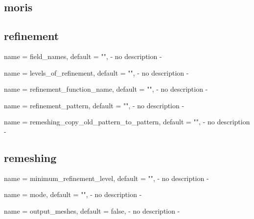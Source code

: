 \subsection{moris}

\subsection{refinement}

\begin{parameter}{
    name    = {field_names},
    default = {""},
}
- no description -
\end{parameter}

\begin{parameter}{
    name    = {levels_of_refinement},
    default = {""},
}
- no description -
\end{parameter}

\begin{parameter}{
    name    = {refinement_function_name},
    default = {""},
}
- no description -
\end{parameter}

\begin{parameter}{
    name    = {refinement_pattern},
    default = {""},
}
- no description -
\end{parameter}

\begin{parameter}{
    name    = {remeshing_copy_old_pattern_to_pattern},
    default = {""},
}
- no description -
\end{parameter}

\subsection{remeshing}

\begin{parameter}{
    name    = {minimum_refinement_level},
    default = {""},
}
- no description -
\end{parameter}

\begin{parameter}{
    name    = {mode},
    default = {""},
}
- no description -
\end{parameter}

\begin{parameter}{
    name    = {output_meshes},
    default = {false},
}
- no description -
\end{parameter}

